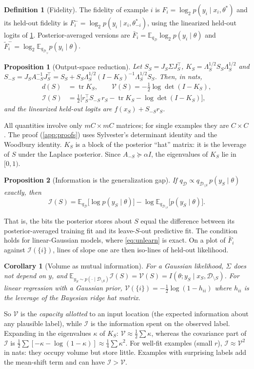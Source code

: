 \documentclass[10pt,twocolumn,letterpaper]{article}
\newtheorem{proposition}{Proposition}
\newtheorem{corollary}{Corollary}
\theoremstyle{definition}
\newtheorem{definition}{Definition}
\newcommand{\tr}{\operatorname{tr}}
\newcommand{\logdet}{\log\det}
\newcommand{\Vol}{\mathcal{V}}
\newcommand{\Inf}{\mathcal{I}}
\newcommand{\D}{\mathcal{D}}
\newcommand{\DS}{\mathcal{D}_{\setminus S}}
\newcommand{\Di}{\mathcal{D}_{\setminus i}}
\newcommand{\T}{^{\top}}
\newcommand{\dof}{d}
\begin{document}
\begin{definition}[Fidelity]
The fidelity of example $i$ is $F_i=\log_2 p(y_i\mid x_i,\theta^*)$ and its held-out fidelity is $F_i^{-}=\log_2 p(y_i\mid x_i,\theta^*_{-i})$, using the linearized held-out logits of \cref{prop:reduction}. Posterior-averaged versions are $\bar F_i=\mathbb{E}_{q_\D}\log_2 p(y_i\mid\theta)$ and $\tilde F^{-}_i=\log_2\mathbb{E}_{q_{\Di}}p(y_i\mid\theta)$.
\end{definition}

\begin{proposition}[Output-space reduction]\label{prop:reduction}
Let $S_S=J_S\Sigma J_S\T$, $K_S=\Lambda_S^{1/2}S_S\Lambda_S^{1/2}$ and $S_{-S}=J_SA_{-S}^{-1}J_S\T=S_S+S_S\Lambda_S^{1/2}(I-K_S)^{-1}\Lambda_S^{1/2}S_S$. Then, in nats,
\begin{align*}
\dof(S)&=\tr K_S,\qquad \Vol(S)=-\tfrac12\logdet(I-K_S),\\
\Inf(S)&=\tfrac12\Big[r_S\T S_{-S}\,r_S-\tr K_S-\logdet(I-K_S)\Big],
\end{align*}
and the linearized held-out logits are $f(x_S)+S_{-S}r_S$.
\end{proposition}
All quantities involve only $mC\times mC$ matrices; for single examples they are $C\times C$. The proof (\cref{app:proofs}) uses Sylvester's determinant identity and the Woodbury identity. $K_S$ is a block of the posterior ``hat'' matrix: it is the leverage of $S$ under the Laplace posterior. Since $A_{-S}\succeq\alpha I$, the eigenvalues of $K_S$ lie in $[0,1)$.

\begin{proposition}[Information is the generalization gap]\label{prop:bayes}
If $q_\D\propto q_{\DS}\,p(y_S\mid\theta)$ exactly, then
\[
\Inf(S)=\mathbb{E}_{q_\D}\big[\log p(y_S\mid\theta)\big]-\log\mathbb{E}_{q_{\DS}}\big[p(y_S\mid\theta)\big].
\]
\end{proposition}
That is, the bits the posterior stores about $S$ equal the difference between its posterior-averaged training fit and its leave-$S$-out predictive fit. The condition holds for linear-Gaussian models, where \cref{eq:unlearn} is exact. On a plot of $\bar F_i$ against $\Inf(\{i\})$, lines of slope one are then iso-lines of held-out likelihood.

\begin{corollary}[Volume as mutual information]\label{cor:mi}
For a Gaussian likelihood, $\Sigma$ does not depend on $y$, and $\mathbb{E}_{y_S\sim p(\cdot\mid \DS)}\Inf(S)=\Vol(S)=I(\theta;y_S\mid x_S,\DS)$. For linear regression with a Gaussian prior, $\Vol(\{i\})=-\tfrac12\log(1-h_{ii})$ where $h_{ii}$ is the leverage of the Bayesian ridge hat matrix.
\end{corollary}
So $\Vol$ is the \emph{capacity allotted} to an input location (the expected information about any plausible label), while $\Inf$ is the information spent on the observed label. Expanding in the eigenvalues $\kappa$ of $K_S$: $\Vol\approx\tfrac12\sum\kappa$, whereas the covariance part of $\Inf$ is $\tfrac12\sum[-\kappa-\log(1-\kappa)]\approx\tfrac14\sum\kappa^2$. For well-fit examples (small $r$), $\Inf\approx\Vol^2$ in nats: they occupy volume but store little. Examples with surprising labels add the mean-shift term and can have $\Inf>\Vol$.
\end{document}

